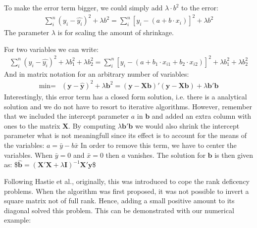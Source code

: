 \documentclass[letterpaper,10pt,english]{jupyterBook}
\begin{document}
\sphinxAtStartPar
To make the error term bigger, we could simply add \(\lambda\cdot b^2\) to the error:
\begin{equation*}
\begin{split}\sum_i^{n}(y_i - \hat{y_i})^2 + \lambda b^2= \sum_i^{n}[y_i - (a + b\cdot x_i)]^{2}+ \lambda b^2\end{split}
\end{equation*}
\sphinxAtStartPar
The parameter \(\lambda\) is for scaling the amount of shrinkage.

\sphinxAtStartPar
For two variables we can write:
\begin{equation*}
\begin{split}\sum_i^{n}(y_i - \hat{y_i})^2 + \lambda b_1^2 + \lambda b_2^2= \sum_i^{n}[y_i - (a + b_1\cdot x_{i1} + b_2\cdot x_{i2})]^{2}+ \lambda b_1^2 + \lambda b_2^2\end{split}
\end{equation*}
\sphinxAtStartPar
And in matrix notation for an arbitrary number of variables:
\begin{align*}
    \text{min}=&(\mathbf{y}-\hat{\mathbf{y}})^2 + \lambda \mathbf{b}^2=(\mathbf{y}-\mathbf{X}\mathbf{b})'(\mathbf{y}-\mathbf{X}\mathbf{b}) + \lambda \mathbf{b}'\mathbf{b}
  \end{align*}
\sphinxAtStartPar
Interestingly, this error term has a closed form solution, i.e. there is a analytical solution and we do not have to resort to iterative algorithms. However, remember that we included the intercept parameter \(a\) in \(\mathbf{b}\) and added an extra column with ones to the matrix \(\mathbf{X}\). By computing \(\lambda \mathbf{b}'\mathbf{b}\) we would also shrink the intercept parameter \sphinxhyphen{} what is not meaningfull since its effect is to account for the means of the variables: \(a=\bar{y} - b\bar{x}\)
In order to remove this term, we have to center the variables. When \(\bar{y}=0\) and \(\bar{x}=0\) then \(a\) vanishes.
The solution for \(\mathbf{b}\) is then given as:
\$\(\hat{\mathbf{b}} = (\mathbf{X}'\mathbf{X} + \lambda\mathbf{I})^{-1}\mathbf{X}'\mathbf{y}\)\$

\sphinxAtStartPar
Following Hastie et al., originally, this was introduced to cope the rank deficency problems. When the algorithm was first proposed, it was not possible to invert a square matrix not of full rank. Hence, adding a small positive amount to its diagonal solved this problem. This can be demonstrated with our numerical example:
\end{document}
